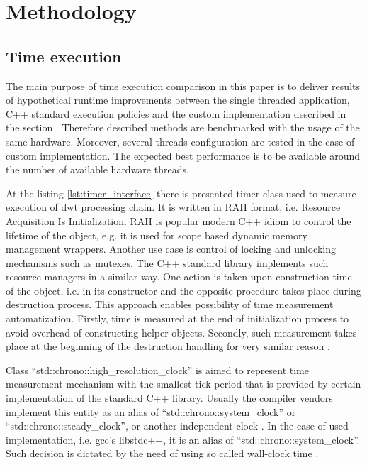 \section{Methodology}

\subsection{Time execution}

The main purpose of time execution comparison in this paper is to deliver results of hypothetical runtime
improvements between the single threaded application, C++ standard execution policies and the custom
implementation described in the section . Therefore described methods are
benchmarked with the usage of the same hardware. Moreover, several threads configuration are tested
in the case of custom implementation. The expected best performance is to be available around
the number of available hardware threads.

At the listing \ref{lst:timer_interface} there is presented timer class used to measure execution of dwt
processing chain. It is written in RAII format, i.e. Resource Acquisition Is Initialization. RAII is 
popular modern C++ idiom to control the lifetime of the object, e.g. it is used for scope based
dynamic memory management wrappers. Another use case is control of locking and unlocking mechanisms such
as mutexes. The C++ standard library implements such resource managers in a similar way. One action
is taken upon construction time of the object, i.e. in its constructor and the opposite procedure
takes place during destruction process. This approach enables possibility of time measurement automatization.
Firstly, time is measured at the end of initialization process to avoid overhead of constructing helper
objects. Secondly, such measurement takes place at the beginning of the destruction handling for
very similar reason \cite{cppreference}.

Class ``std::chrono::high\_resolution\_clock'' is aimed to represent time measurement mechanism with the
smallest tick period that is provided by certain implementation of the standard C++ library. Usually
the compiler vendors implement this entity as an alias of ``std::chrono::system\_clock'' or
``std::chrono::steady\_clock'', or another independent clock \cite{cppreference}. In the case of used implementation,
i.e. gcc's libstdc++, it is an alias of ``std::chrono::system\_clock''. Such decision is dictated by
the need of using so called wall-clock time \cite{cppreference}.

